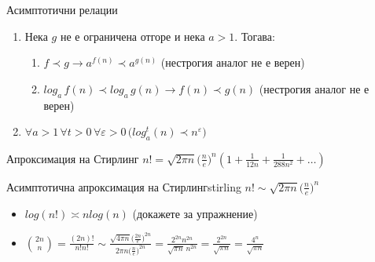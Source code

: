 \begin{boxmainproperties}{Асимптотични релации}{}
\begin{enumerate}
			  Обратната посока $\textbf{не}$ е вярна.
		\item Нека $g$ не е ограничена отгоре и нека $a>1$. Тогава:
			  \begin{enumerate}
			  	\item $f\prec g\rightarrow a^{f(n)}\prec a^{g(n)}$ (нестрогия аналог $\textbf{не}$ е верен)
			  	\item $log_a\,f(n)\prec log_a\,g(n)\rightarrow f(n)\prec g(n)$ (нестрогия аналог $\textbf{не}$ е верен)
			  \end{enumerate}
		\item $\forall a>1\,\forall t>0\,\forall\varepsilon>0\,\big(log_a^t(n)\prec n^\varepsilon\big)$
	\end{enumerate}
\end{boxmainproperties}

\begin{boxfact}{Апроксимация на Стирлинг}{}
	$n!=\sqrt{2\pi n}\big(\frac{n}{e}\big)^n(1+\frac{1}{12n}+\frac{1}{288n^2}+\dots)$
\end{boxfact}

\begin{boxcorollary}{Асимптотична апроксимация на Стирлинг}{stirling}%
	$n!\sim\sqrt{2\pi n}\big(\frac{n}{e}\big)^n$
\end{boxcorollary}

\begin{application*}
	\leavevmode
	\begin{itemize}
		\item $log(n!)\asymp nlog(n)$ (докажете за упражнение)
		\item $\binom{2n}{n}=\frac{(2n)!}{n!n!}\sim\frac{\sqrt{4\pi n}\big(\frac{2n}{e}\big)^{2n}}{2\pi n\big(\frac{n}{e}\big)^{2n}}=\frac{2^{2n}n^{2n}}{\sqrt{\pi n}\,n^{2n}}=\frac{2^{2n}}{\sqrt{\pi n}}=\frac{4^n}{\sqrt{\pi n}}$
	\end{itemize}
\end{application*}

